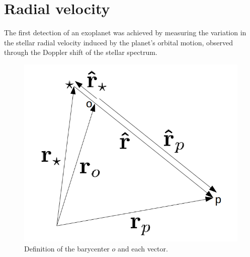 \section{Radial velocity}\label{sec:rv}

The first detection of an exoplanet was achieved by measuring the variation in the stellar radial velocity induced by the planet’s orbital motion, observed through the Doppler shift of the stellar spectrum.

\begin{figure}[]
\begin{center}
\includegraphics[bb=0 0 648 537,width=1.0\linewidth]{fig/rvector.png}
\end{center}
\caption{Definition of the barycenter $o$ and each vector.\label{fig:rvector}}
\end{figure}

